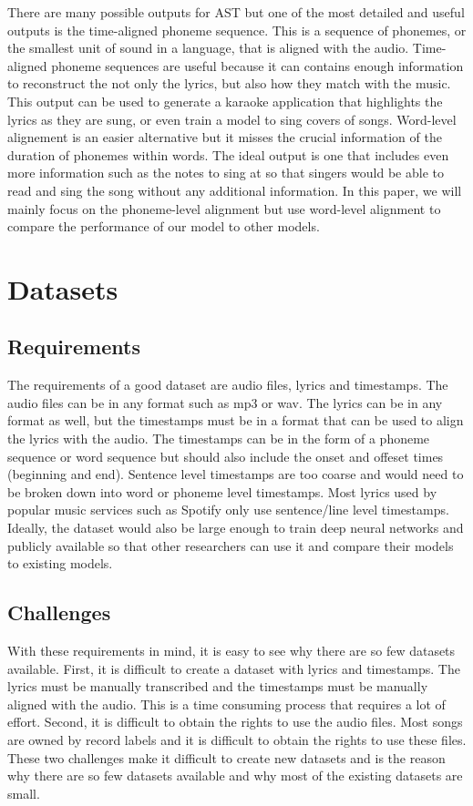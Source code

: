\documentclass[letterpaper, 12pt]{article}
\begin{document}
\begin{multicols*}{2}
There are many possible outputs for AST but one of the most detailed and useful outputs is the
time-aligned phoneme sequence. This is a sequence of phonemes, or the smallest unit of sound in a
language, that is aligned with the audio. Time-aligned phoneme sequences are useful because it can contains enough
information to reconstruct the not only the lyrics, but also how they match with the music. This
output can be used to generate a karaoke application that highlights the lyrics as they are sung,
or even train a model to sing covers of songs. Word-level alignement is an easier alternative but it
misses the crucial information of the duration of phonemes within words. The ideal output is one that includes even more information
such as the notes to sing at so that singers would be able to read and sing the song without any
additional information. In this paper, we will mainly focus on the phoneme-level alignment but use
word-level alignment to compare the performance of our model to other models.


\section{Datasets}

\subsection{Requirements}
The requirements of a good dataset are audio files, lyrics and timestamps. The audio files can be
in any format such as mp3 or wav. The lyrics can be in any format as well, but the timestamps must
be in a format that can be used to align the lyrics with the audio. The timestamps can be in the
form of a phoneme sequence or word sequence but should also include the onset and offeset times
(beginning and end). Sentence level timestamps are too coarse and would need
to be broken down into word or phoneme level timestamps. Most lyrics used by popular music services
such as Spotify only use sentence/line level timestamps. Ideally, the dataset would also be large
enough to train deep neural networks and publicly available so that other researchers can use it and
compare their models to existing models.

\subsection{Challenges}
With these requirements in mind, it is easy to see why there are so few datasets available. First,
it is difficult to create a dataset with lyrics and timestamps. The lyrics must be manually
transcribed and the timestamps must be manually aligned with the audio. This is a time consuming
process that requires a lot of effort. Second, it is difficult to obtain the rights to use the
audio files. Most songs are owned by record labels and it is difficult to obtain the rights to use
these files. These two challenges make it difficult to create new datasets and is the reason why
there are so few datasets available and why most of the existing datasets are small.


\end{multicols*}
\end{document}
